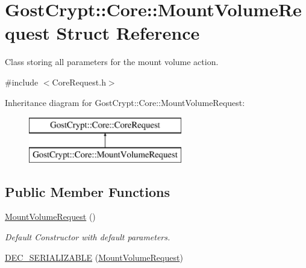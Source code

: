 \hypertarget{struct_gost_crypt_1_1_core_1_1_mount_volume_request}{}\section{Gost\+Crypt\+:\+:Core\+:\+:Mount\+Volume\+Request Struct Reference}
\label{struct_gost_crypt_1_1_core_1_1_mount_volume_request}


Class storing all parameters for the mount volume action.  




{\ttfamily \#include $<$Core\+Request.\+h$>$}

Inheritance diagram for Gost\+Crypt\+:\+:Core\+:\+:Mount\+Volume\+Request\+:\begin{figure}[H]
\begin{center}
\leavevmode
\includegraphics[height=2.000000cm]{struct_gost_crypt_1_1_core_1_1_mount_volume_request}
\end{center}
\end{figure}
\subsection*{Public Member Functions}
\begin{DoxyCompactItemize}
\item 
\hyperlink{struct_gost_crypt_1_1_core_1_1_mount_volume_request_aeec55651b6e63c80351c2dd406b63b90}{Mount\+Volume\+Request} ()
\begin{DoxyCompactList}\small\item\em Default Constructor with default parameters. \end{DoxyCompactList}\item 
\hyperlink{struct_gost_crypt_1_1_core_1_1_mount_volume_request_aadfba3e3bedf76e1bfa45b66b0012536}{D\+E\+C\+\_\+\+S\+E\+R\+I\+A\+L\+I\+Z\+A\+B\+LE} (\hyperlink{struct_gost_crypt_1_1_core_1_1_mount_volume_request}{Mount\+Volume\+Request})
\end{DoxyCompactItemize}
